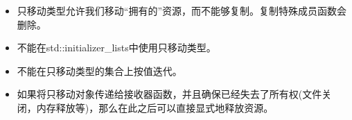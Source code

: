 \begin{itemize}
	\item 只移动类型允许我们移动“拥有的”资源，而不能够复制。复制特殊成员函数会删除。
	\item 不能在std::initializer_lists中使用只移动类型。
	\item 不能在只移动类型的集合上按值迭代。
	\item 如果将只移动对象传递给接收器函数，并且确保已经失去了所有权(文件关闭，内存释放等)，那么在此之后可以直接显式地释放资源。
\end{itemize}


